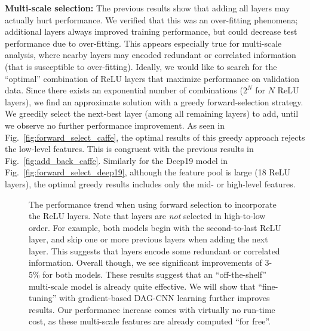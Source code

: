 \documentclass[10pt,twocolumn,letterpaper]{article}
\begin{document}
{\bf Multi-scale selection:} The previous results show that adding all layers may actually hurt performance. We verified that this was an over-fitting phenomena; additional layers always improved training performance, but could decrease test performance due to over-fitting. This appears especially true for multi-scale analysis, where nearby layers may encoded redundant or correlated information (that is susceptible to over-fitting). Ideally, we would like to search for the ``optimal'' combination of ReLU layers that maximize performance on validation data. Since there exists an exponential number of combinations ($2^N$ for $N$ ReLU layers), we find an approximate solution with a greedy forward-selection strategy. We greedily select the next-best layer (among all remaining layers) to add, until we observe no further performance improvement. As seen in Fig.~\ref{fig:forward_select_caffe}, the optimal results of this greedy approach rejects the low-level features. This is congruent with the previous results in Fig.~\ref{fig:add_back_caffe}. Similarly for the Deep19 model in Fig.~\ref{fig:forward_select_deep19}, although the feature pool is large (18 ReLU layers), the optimal greedy results includes only the mid- or high-level features. 

\begin{figure}[htbp]
\centering
\caption{The performance trend when using forward selection to incorporate the ReLU layers. Note that layers are {\em not} selected in high-to-low order. For example, both models begin with the second-to-last ReLU layer, and skip one or more previous layers when adding the next layer. This suggests that layers encode some redundant or correlated information. Overall though, we see significant improvements of 3-5\% for both models. These results suggest that an ``off-the-shelf'' multi-scale model is already quite effective. We will show that ``fine-tuning'' with gradient-based DAG-CNN learning further improves results. Our performance increase comes with virtually no run-time cost, as these multi-scale features are already computed ``for free''.}

\label{fig:forward_select}
\end{figure}
\end{document}
